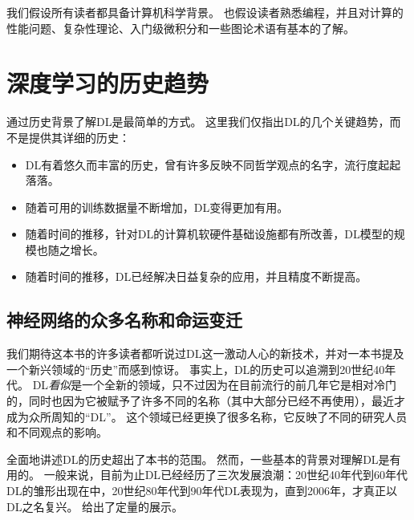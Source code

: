 
我们假设所有读者都具备计算机科学背景。
也假设读者熟悉编程，并且对计算的性能问题、复杂性理论、入门级微积分和一些图论术语有基本的了解。
% 
\section{深度学习的历史趋势}
\label{sec:historical_trends_in_deep_learning}
通过历史背景了解\gls{DL}是最简单的方式。
这里我们仅指出\gls{DL}的几个关键趋势，而不是提供其详细的历史：
\begin{itemize}
 \item \gls{DL}有着悠久而丰富的历史，曾有许多反映不同哲学观点的名字，流行度起起落落。
 \item 随着可用的训练数据量不断增加，\gls{DL}变得更加有用。
 \item 随着时间的推移，针对\gls{DL}的计算机软硬件基础设施都有所改善，\gls{DL}模型的规模也随之增长。
 \item 随着时间的推移，\gls{DL}已经解决日益复杂的应用，并且精度不断提高。
\end{itemize}

\subsection{神经网络的众多名称和命运变迁}
\label{sec:the_many_names_and_changing_fortunes_of_neural_networks}

我们期待这本书的许多读者都听说过\gls{DL}这一激动人心的新技术，并对一本书提及一个新兴领域的``历史''而感到惊讶。
事实上，\gls{DL}的历史可以追溯到20世纪40年代。
\gls{DL}\emph{看似}是一个全新的领域，只不过因为在目前流行的前几年它是相对冷门的，同时也因为它被赋予了许多不同的名称（其中大部分已经不再使用），最近才成为众所周知的``\gls{DL}''。
这个领域已经更换了很多名称，它反映了不同的研究人员和不同观点的影响。

全面地讲述\gls{DL}的历史超出了本书的范围。
然而，一些基本的背景对理解\gls{DL}是有用的。
一般来说，目前为止\gls{DL}已经经历了三次发展浪潮：20世纪40年代到60年代\gls{DL}的雏形出现在中，20世纪80年代到90年代\gls{DL}表现为，直到2006年，才真正以\gls{DL}之名复兴。
给出了定量的展示。

